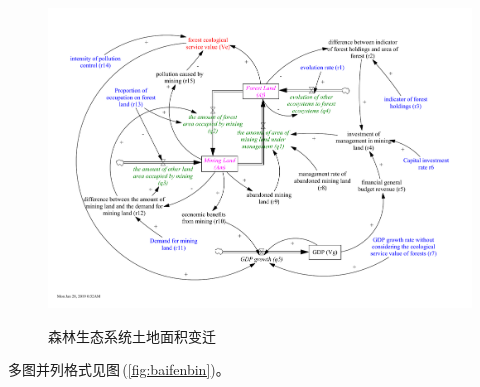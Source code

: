 \begin{figure}[htbp]
  \centering
  \includegraphics[width=\textwidth]{./pictures/dynamic.pdf}\\
  \caption{\small\heiti 森林生态系统土地面积变迁}\label{fig:dynamic}
\end{figure}

多图并列格式见图\,(\ref{fig:baifenbin})。

